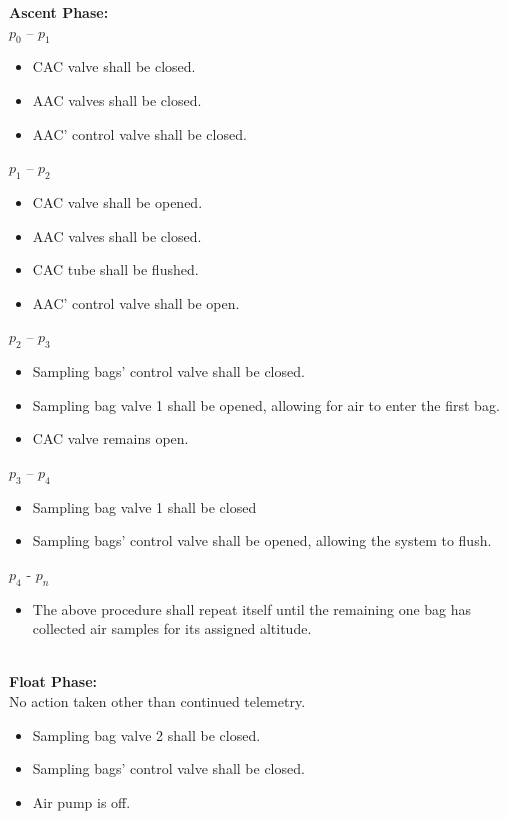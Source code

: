 \textbf{Ascent Phase:}\\
$p_0$ – $p_1$
\begin{itemize}
    \item CAC valve shall be closed.
    \item AAC valves shall be closed.
    \item AAC' control valve shall be closed.
    \end{itemize}
$p_1$ – $p_2$
\begin{itemize}
    \item CAC valve shall be opened.
    \item AAC valves shall be closed.
    \item CAC tube shall be flushed.
    \item AAC' control valve shall be open.
    \end{itemize}
$p_2$ – $p_3$
\begin{itemize}
    \item Sampling bags' control valve shall be closed.
    \item Sampling bag valve 1 shall be opened, allowing for air to enter the first bag.
    \item CAC valve remains open.
    \end{itemize}
$p_3$ – $p_4$
\begin{itemize}
    \item Sampling bag valve 1 shall be closed
    \item Sampling bags' control valve shall be opened, allowing the system to flush. 
    \end{itemize}
$p_4$ - $p_n$
\begin{itemize}
    \item The above procedure shall repeat itself until the remaining one bag has collected air samples for its assigned altitude.
    \end{itemize}



\textbf{\\Float Phase:}\\
No action taken other than continued telemetry.
\begin{itemize}
    \item Sampling bag valve 2 shall be closed.
    \item Sampling bags' control valve shall be closed.
    \item Air pump is off.
\end{itemize}\\
 
